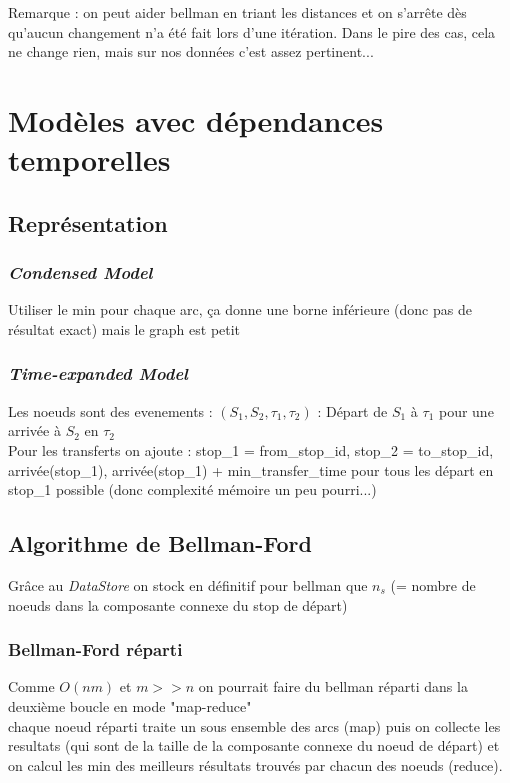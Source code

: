 \documentclass[a4paper,11pt]{article}
\begin{document}
Remarque : on peut aider bellman en triant les distances et on s'arrête dès qu'aucun changement n'a été fait lors d'une itération.
Dans le pire des cas, cela ne change rien, mais sur nos données c'est assez pertinent...

\section{Modèles avec dépendances temporelles}
\subsection{Représentation}
\subsubsection{\textit{Condensed Model}}
Utiliser le min pour chaque arc, ça donne une borne inférieure (donc pas de résultat exact) mais le graph est petit
\subsubsection{\textit{Time-expanded Model}}
Les noeuds sont des evenements : $(S_1,S_2,\tau_1,\tau_2)$ : Départ de $S_1$ à $\tau_1$ pour une arrivée à $S_2$ en $\tau_2$\\
Pour les transferts on ajoute : stop\_1 = from\_stop\_id, stop\_2 = to\_stop\_id, arrivée(stop\_1), arrivée(stop\_1) + min\_transfer\_time
pour tous les départ en stop\_1 possible (donc complexité mémoire un peu pourri...)

\subsection{Algorithme de Bellman-Ford}

Grâce au \textit{DataStore} on stock en définitif pour bellman que $n_s$ (= nombre de noeuds dans la composante connexe du stop de départ)

\subsubsection{Bellman-Ford réparti}
Comme $O(nm)$ et $m >> n$ on pourrait faire du bellman réparti dans la deuxième boucle en mode "map-reduce"\\
chaque noeud réparti traite un sous ensemble des arcs (map) puis on collecte les resultats (qui sont de la taille de la composante connexe du noeud de départ)
et on calcul les min des meilleurs résultats trouvés par chacun des noeuds (reduce).
\end{document}
